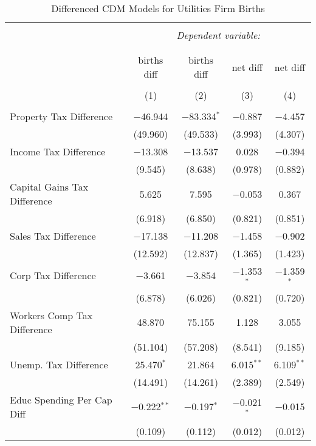 
\begin{table}[!htbp] \centering 
  \caption{Differenced CDM Models for  Utilities Firm Births} 
  \label{} 
\begin{tabular}{@{\extracolsep{5pt}}lcccc} 
\\[-1.8ex]\hline 
\hline \\[-1.8ex] 
 & \multicolumn{4}{c}{\textit{Dependent variable:}} \\ 
\cline{2-5} 
\\[-1.8ex] & \multicolumn{4}{c}{ } \\ 
 & births diff & births diff & net diff & net diff \\ 
\\[-1.8ex] & (1) & (2) & (3) & (4)\\ 
\hline \\[-1.8ex] 
 Property Tax Difference & $-$46.944 & $-$83.334$^{*}$ & $-$0.887 & $-$4.457 \\ 
  & (49.960) & (49.533) & (3.993) & (4.307) \\ 
  Income Tax Difference & $-$13.308 & $-$13.537 & 0.028 & $-$0.394 \\ 
  & (9.545) & (8.638) & (0.978) & (0.882) \\ 
  Capital Gains Tax Difference & 5.625 & 7.595 & $-$0.053 & 0.367 \\ 
  & (6.918) & (6.850) & (0.821) & (0.851) \\ 
  Sales Tax Difference & $-$17.138 & $-$11.208 & $-$1.458 & $-$0.902 \\ 
  & (12.592) & (12.837) & (1.365) & (1.423) \\ 
  Corp Tax Difference & $-$3.661 & $-$3.854 & $-$1.353$^{*}$ & $-$1.359$^{*}$ \\ 
  & (6.878) & (6.026) & (0.821) & (0.720) \\ 
  Workers Comp Tax Difference & 48.870 & 75.155 & 1.128 & 3.055 \\ 
  & (51.104) & (57.208) & (8.541) & (9.185) \\ 
  Unemp. Tax Difference & 25.470$^{*}$ & 21.864 & 6.015$^{**}$ & 6.109$^{**}$ \\ 
  & (14.491) & (14.261) & (2.389) & (2.549) \\ 
  Educ Spending Per Cap Diff & $-$0.222$^{**}$ & $-$0.197$^{*}$ & $-$0.021$^{*}$ & $-$0.015 \\ 
  & (0.109) & (0.112) & (0.012) & (0.012) \\ 

\end{tabular}
\end{table}
